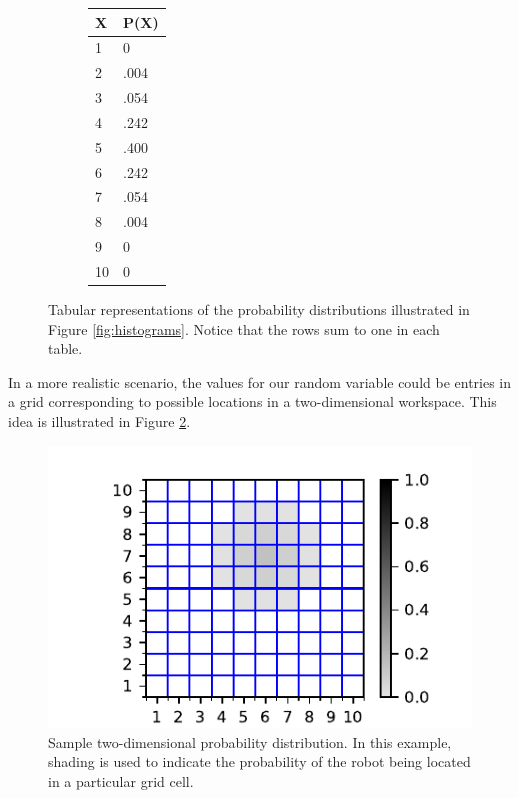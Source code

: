 \begin{figure}
\begin{center}
\begin{subfigure}[b]{0.3\textwidth}
      \begin{center}
        \begin{tabular}[b]{|l|l|}
    \hline
    X            & P(X) \\
    \hline
    1       & 0    \\
    \hline
    2        & .004   \\
    \hline
    3        & .054   \\
    \hline
    4        & .242     \\
    \hline
    5   & .400    \\
    \hline
    6      & .242   \\
    \hline
    7   & .054  \\
    \hline
    8      & .004     \\
    \hline
    9 & 0    \\
    \hline
    10 & 0    \\
    \hline
  \end{tabular} 
      \end{center}
      \caption{}
    \end{subfigure}
  \end{center}
  \caption{Tabular representations of the probability distributions
    illustrated in Figure \ref{fig:histograms}. Notice that the rows
    sum to one in each table.}
  \label{fig:prob-tables}
\end{figure}

In a more realistic scenario, the values for our random variable could
be entries in a grid corresponding to possible locations in a
two-dimensional workspace.  This idea is illustrated in Figure
\ref{fig:2dhist}.


\begin{figure}
  \begin{center}
  
      \includegraphics[]{probability/figs/2dhist.pdf}
   
  \end{center}
  \caption{Sample two-dimensional probability distribution.  In this
    example, shading is used to indicate the probability of the robot
    being located in a particular grid cell.}
  \label{fig:2dhist}
\end{figure}


